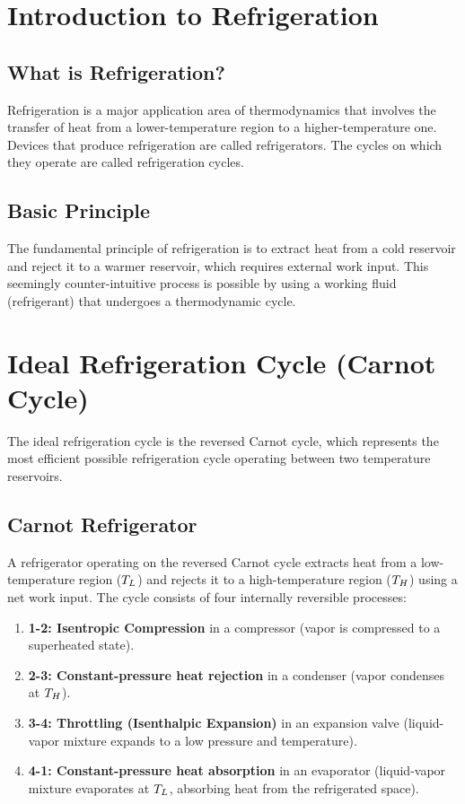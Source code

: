 \section{Introduction to Refrigeration}

\subsection{What is Refrigeration?}
Refrigeration is a major application area of thermodynamics that involves the transfer of heat from a lower-temperature region to a higher-temperature one. Devices that produce refrigeration are called refrigerators. The cycles on which they operate are called refrigeration cycles.

\subsection{Basic Principle}
The fundamental principle of refrigeration is to extract heat from a cold reservoir and reject it to a warmer reservoir, which requires external work input. This seemingly counter-intuitive process is possible by using a working fluid (refrigerant) that undergoes a thermodynamic cycle.

\section{Ideal Refrigeration Cycle (Carnot Cycle)}

The ideal refrigeration cycle is the reversed Carnot cycle, which represents the most efficient possible refrigeration cycle operating between two temperature reservoirs.

\subsection{Carnot Refrigerator}
A refrigerator operating on the reversed Carnot cycle extracts heat from a low-temperature region ($T_L$) and rejects it to a high-temperature region ($T_H$) using a net work input.
The cycle consists of four internally reversible processes:
\begin{enumerate}
    \item \textbf{1-2: Isentropic Compression} in a compressor (vapor is compressed to a superheated state).
    \item \textbf{2-3: Constant-pressure heat rejection} in a condenser (vapor condenses at $T_H$).
    \item \textbf{3-4: Throttling (Isenthalpic Expansion)} in an expansion valve (liquid-vapor mixture expands to a low pressure and temperature).
    \item \textbf{4-1: Constant-pressure heat absorption} in an evaporator (liquid-vapor mixture evaporates at $T_L$, absorbing heat from the refrigerated space).
\end{enumerate}

